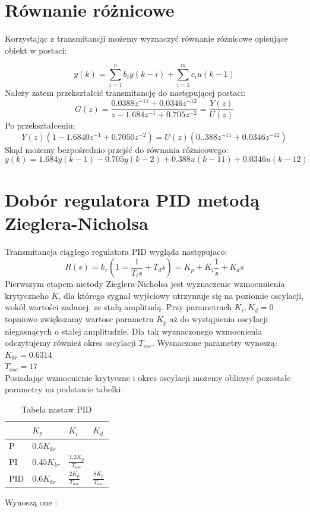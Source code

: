 \documentclass[a4paper, 11pt]{article}
\begin{document}
\section{Równanie różnicowe}
Korzystając z transmitancji możemy wyznaczyć równanie różnicowe opisujące obiekt w postaci: 

$$y(k) = \sum_{i=1}^{n} b_iy(k-i)+ \sum_{i=1}^{m} c_iu(k-1)$$
Należy zatem przekształcić transmitancję do następującej postaci: 
$$G(z) = \frac{0.0388z^{-11}+0.0346z^{-12}}{z-1.684z^{-1}+0.705z^{-2}} = \frac{Y(z)}{U(z)}$$
Po przekształceniu: 
$$Y(z)(1-1.6840z^{-1}+0.7050z^{-2}) = U(z)(0..388z^{-11}+0.0346z^{-12})$$
Skąd możemy bezpośrednio przejść do równania różnicowego: 
$$y(k) = 1.684y(k-1) - 0.705y(k-2) + 0.388u(k-11) + 0.0346u(k-12)$$


\section{Dobór regulatora PID metodą Zieglera-Nicholsa}
Transmitancja ciągłego regulatora PID wygląda następujaco: 
$$R(s) = k_r(1=\frac{1}{T_is}+T_ds)=K_p + K_i\frac{1}{s}+K_ds$$
Pierwszym etapem metody Zieglera-Nicholsa jest wyznaczenie wzmocnnienia krytyczneho $K$, dla którego sygnał wyjściowy utrzymuje się na poziomie oscylacji, wokół wartości zadanej, ze stałą amplitudą. Przy parametrach $K_i, K_d=0$ topniowo zwiększamy wartosc parametru $K_p$ aż do wystąpienia oscylacji niegasnących o stałej amplitudzie. Dla tak wyznaczonego wzmocnienia odczytujemy również okres oscylacji $T_{osc}$. Wysnaczone parametry wynoszą: \\

$K_{kr} = 0.6314$\\
\indent $T_{osc} = 17$\\

Posiadając wzmocnienie krytyczne i okres oscylacji możemy obliczyć pozostałe parametry na podstawie tabelki: 
\begin{table}[htp]
\centering
\caption{Tabela nastaw PID}
\label{my-label}
\begin{tabular}{|l|l|l|l|}
\hline
    & $K_p$       & $K_i $                & $K_d $              \\
\hline
P   & $0.5K_{kr} $ &                    &                   \\
\hline
PI   & $0.45K_{kr}$ & $\frac{1.2K_p}{T_{osc}}$ &                   \\
\hline
PID & $0.6K_{kr} $ & $\frac{2K_p}{T_{osc}}$   & $\frac{8K_p}{T_{osc}}$ \\
\hline
\end{tabular}
\end{table}
Wynoszą one :\\
\end{document}
